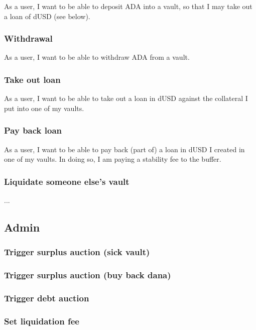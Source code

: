 \documentclass{article} %
\begin{document}
As a user, I want to be able to deposit ADA into a vault, so that I may take out
a loan of dUSD (see below).

\subsubsection{Withdrawal}

As a user, I want to be able to withdraw ADA from a vault.

\subsubsection{Take out loan}

As a user, I want to be able to take out a loan in dUSD against the collateral I
put into one of my vaults.

\subsubsection{Pay back loan}

As a user, I want to be able to pay back (part of) a loan in dUSD I created in
one of my vaults. In doing so, I am paying a stability fee to the buffer.

\subsubsection{Liquidate someone else's vault}

...

\subsection{Admin}

\subsubsection{Trigger surplus auction (sick vault)}

\subsubsection{Trigger surplus auction (buy back dana)}

\subsubsection{Trigger debt auction}

\subsubsection{Set liquidation fee}
\end{document}
